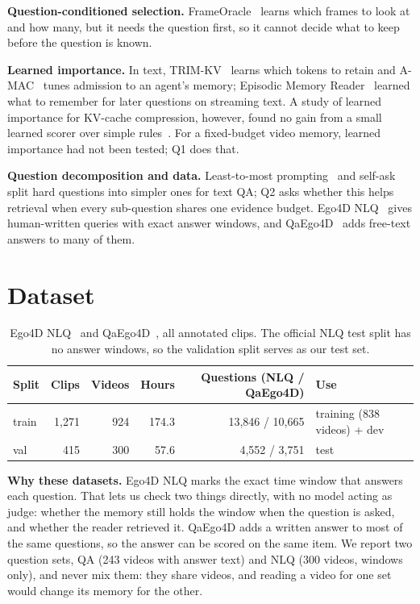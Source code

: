 \documentclass[11pt,a4paper]{article}
\begin{document}
\textbf{Question-conditioned selection.} FrameOracle~\cite{frameoracle} learns which frames to look at and how many, but it
needs the question first, so it cannot decide what to keep before the question is known.

\textbf{Learned importance.} In text, TRIM-KV~\cite{trimkv} learns which tokens to retain and A-MAC~\cite{amac} tunes
admission to an agent's memory; Episodic Memory Reader~\cite{emr} learned what to remember for later questions on
streaming text. A study of learned importance for KV-cache compression, however, found no gain from a small learned scorer
over simple rules~\cite{limits}. For a fixed-budget video memory, learned importance had not been tested; Q1 does that.

\textbf{Question decomposition and data.} Least-to-most prompting~\cite{leasttomost} and self-ask~\cite{selfask} split hard
questions into simpler ones for text QA; Q2 asks whether this helps retrieval when every sub-question shares one evidence
budget. Ego4D NLQ~\cite{ego4d} gives human-written queries with exact answer windows, and QaEgo4D~\cite{qaego4d} adds
free-text answers to many of them.

\section{Dataset}\label{sec:data}

\begin{table}[t]\centering\small
\caption{Ego4D NLQ~\cite{ego4d} and QaEgo4D~\cite{qaego4d}, all annotated clips. The official NLQ test split has no answer
windows, so the validation split serves as our test set.}\label{tab:data}
\begin{tabular}{lrrrrl}
\toprule
Split & Clips & Videos & Hours & Questions (NLQ / QaEgo4D) & Use \\
\midrule
train & 1,271 & 924 & 174.3 & 13,846 / 10,665 & training (838 videos) + dev \\
val   & 415   & 300 & 57.6  & 4,552 / 3,751  & test \\
\bottomrule
\end{tabular}
\end{table}

\textbf{Why these datasets.} Ego4D NLQ marks the exact time window that answers each question. That lets us check two
things directly, with no model acting as judge: whether the memory still holds the window when the question is asked, and
whether the reader retrieved it. QaEgo4D adds a written answer to most of the same questions, so the answer can be scored
on the same item. We report two question sets, QA (243 videos with answer text) and NLQ (300 videos, windows only), and
never mix them: they share videos, and reading a video for one set would change its memory for the other.
\end{document}

